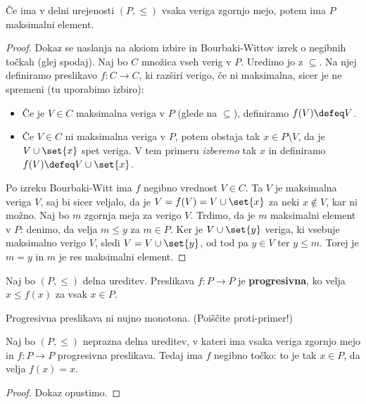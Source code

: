 \begin{lema}
  Če ima v delni urejenosti $(P, {\leq})$ vsaka veriga zgornjo mejo,
  potem ima $P$ maksimalni element.
\end{lema}

\begin{proof}
  Dokaz se naslanja na aksiom izbire in Bourbaki-Wittov izrek o negibnih točkah (glej
  spodaj). Naj bo $C$ množica vseh verig v $P$. Uredimo jo z $\subseteq$. Na njej definiramo preslikavo
  $f : C \to C$, ki razširi verigo, če ni maksimalna, sicer je ne spremeni (tu uporabimo
  izbiro):
  \begin{itemize}
  \item Če je $V \in C$ maksimalna veriga v $P$ (glede na $\subseteq$), definiramo $f(V) \defeq V$.
  \item Če $V \in C$ ni maksimalna veriga v $P$, potem obstaja tak $x \in P \setminus V$, da je $V
    \cup \set{x}$ spet veriga. V tem primeru \emph{izberemo} tak $x$ in definiramo $f(V) \defeq V
    \cup \set{x}$.
  \end{itemize}
  Po izreku Bourbaki-Witt ima $f$ negibno vrednost $V \in C$. Ta $V$ je maksimalna
  veriga $V$, saj bi sicer veljalo, da je $V = f(V) = V \cup \set{x}$ za neki $x \not\in V$,
  kar ni možno. Naj bo $m$ zgornja meja za verigo $V$. Trdimo, da je $m$
  maksimalni element v $P$: denimo, da velja $m \leq y$ za $m \in P$. Ker je $V \cup \set{y}$
  veriga, ki vsebuje maksimalno verigo $V$, sledi $V = V \cup \set{y}$, od tod pa $y \in V$
  ter $y \leq m$. Torej je $m = y$ in $m$ je res maksimalni element.
\end{proof}

\begin{definicija}
  Naj bo $(P, \leq)$ delna ureditev. Preslikava $f : P \to P$ je \textbf{progresivna}, ko
  velja $x \leq f(x)$ za vsak $x \in P$.
\end{definicija}

\begin{opomba}
  Progresivna preslikava ni nujno monotona. (Poiščite proti-primer!)
\end{opomba}

\begin{izrek}
  Naj bo $(P, {\leq})$ neprazna delna ureditev, v kateri ima vsaka veriga zgornjo mejo in $f : P \to P$ progresivna
  preslikava. Tedaj ima $f$ negibno točko: to je tak $x \in P$, da velja $f(x) = x$.
\end{izrek}

\begin{proof}
  Dokaz opustimo.
\end{proof}

